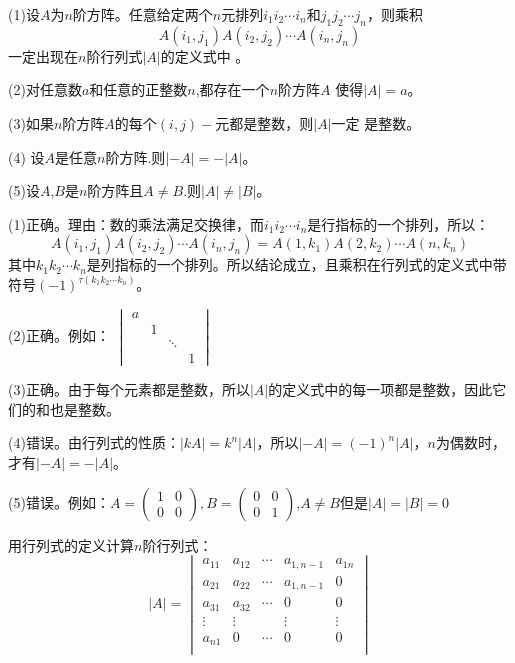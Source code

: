 \documentclass[a4paper]{report}
\begin{document}
(1)设$A$为$n$阶方阵。任意给定两个$n$元排列$i_1i_2\cdots i_n$和$j_1j_2\cdots j_n$，则乘积
\begin{equation*}
A(i_1,j_1)A(i_2,j_2)\cdots A(i_n,j_n)
\end{equation*}
一定出现在$n$阶行列式$|A|$的定义式中 。

(2)对任意数$a$和任意的正整数$n$,都存在一个$n$阶方阵$A$
使得$|A|=a$。

(3)如果$n$阶方阵$A$的每个$(i,j)-$元都是整数，则$|A|$一定
是整数。

(4) 设$A$是任意$n$阶方阵.则$|-A|=-|A|$。

(5)设$A$,$B$是$n$阶方阵且$A\neq B$.则$|A|\neq |B|$。

\begin{jie}
(1)正确。理由：数的乘法满足交换律，而$i_1i_2\cdots i_n$是行指标的一个排列，所以：
\begin{equation*}
A(i_1,j_1)A(i_2,j_2)\cdots A(i_n,j_n)=A(1,k_1)A(2,k_2)\cdots A(n,k_n)
\end{equation*}
其中$k_1k_2\cdots k_n$是列指标的一个排列。所以结论成立，且乘积在行列式的定义式中带符号$(-1)^{\tau(k_1k_2\cdots k_n)}$。

(2)正确。例如：
$
\begin{vmatrix}
 a&&&\\
 &1&&\\
 &&\ddots&\\
 &&&1
\end{vmatrix}$

(3)正确。由于每个元素都是整数，所以$|A|$的定义式中的每一项都是整数，因此它们的和也是整数。

(4)错误。由行列式的性质：$|kA|=k^{n}|A|$，所以$|-A|=(-1)^n|A|$，$n$为偶数时，才有$|-A|=-|A|$。

(5)错误。例如：$A=
\begin{pmatrix}
1&0\\
0&0
\end{pmatrix},B=
\begin{pmatrix}
0&0\\
0&1
\end{pmatrix}
$,$A\neq B$但是$|A|=|B|=0$
\end{jie}

\EX 用行列式的定义计算$n$阶行列式：
\begin{equation*}
|A|=
\begin{vmatrix}
a_{11}&a_{12}&\cdots&a_{1,n-1}&a_{1n}\\
a_{21}&a_{22}&\cdots&a_{1,n-1}&0\\
a_{31}&a_{32}&\cdots&0&0\\
\vdots&\vdots&&\vdots&\vdots\\
a_{n1}&0&\cdots&0&0\\
\end{vmatrix}
\end{equation*}
\end{document}
